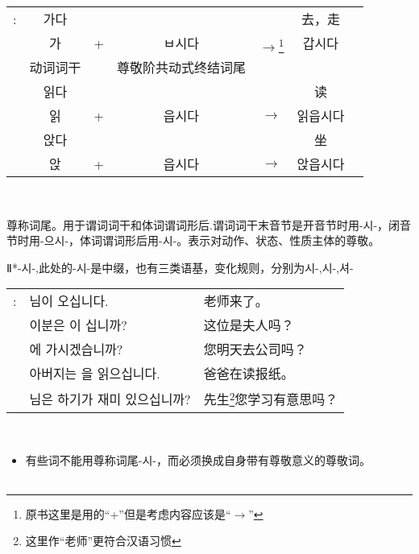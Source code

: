 \begin{grammar}
\begin{grammarsect}[\kr -(으){}ㅂ시다]
\begin{tabular}{ccccccc}
            \kr \ruby{例}{예}:&\kr 가다&&&&去，走\\
            &\kr 가&+&\kr ㅂ시다&$\to$\footnote{原书这里是用的``+''但是考虑内容应该是``$\to$''}&\kr 갑시다\\\cline{2-2}\cline{4-4}
            &动词词干&&尊敬阶共动式终结词尾\\
            &\kr 읽다 &&&&读\\
            &\kr 읽 &+&\kr 읍시다&$\to$&\kr  읽읍시다\\
            &\kr 앉다 &&&&坐\\
            &\kr 앉 &+&\kr 읍시다&$\to$&\kr 앉읍시다
        \end{tabular}\\
    \end{grammarsect}
\end{grammar}
\begin{grammar}
    \begin{grammarsect}[\kr -(으){}시-]\label{gram:si}
        \begin{itemize}
            \item 尊称词尾。用于谓词词干和体词谓词形后.谓词词干末音节是开音节时用{\kr -시-}，闭音节时用{\kr -으시-}，体词谓词形后用{\kr -시-}。表示对动作、状态、性质主体的尊敬。
            {\color{gray} \item Ⅱ*{\kr -시-},此处的{\kr -시-}是中缀，也有三类语基，变化规则，分别为{\kr 시-,시-,셔-}}
        \end{itemize}
        \begin{tabular}{lll}
            \kr \ruby{例}{예}: &\kr \ruby{先生}{선생}님이 오십니다.&老师来了。\\
            &\kr 이분은 \ruby{夫人}{부인}이 십니까?&这位是夫人吗？\\ 
            &\kr \ruby{來日}{내일} \ruby{會社}{회사}에 가시겠습니까?&您明天去公司吗？\\
            &\kr 아버지는 \ruby{新聞}{신문}을 읽으십니다.&爸爸在读报纸。\\
            &\kr \ruby{先生}{선생}님은 \ruby{工夫}{공부}하기가 재미 있으십니까?&先生\footnote{这里作“老师”更符合汉语习惯}您学习有意思吗？
        \end{tabular}\\
        \begin{itemize}
            \item 有些词不能用尊称词尾{\kr -시-}，而必须换成自身带有尊敬意义的尊敬词。
        \end{itemize}
        \begin{tabular}{lllll}

\end{tabular}
\end{grammarsect}
\end{grammar}

